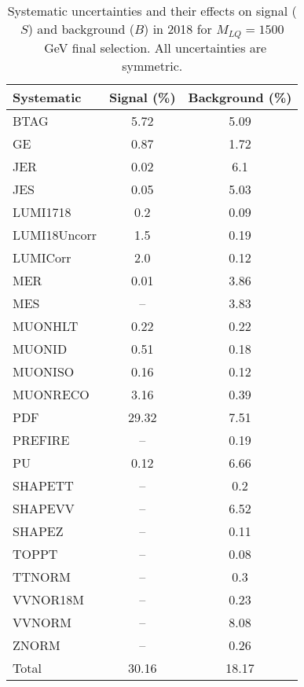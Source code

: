 \begin{table}[htbp]
\begin{center}
\caption{Systematic uncertainties and their effects on signal ($S$) and background ($B$) in 2018 for $M_{LQ}=1500$~GeV final selection. All uncertainties are symmetric.}
\begin{tabular}{lcc}
\hline\hline
Systematic & Signal (\%) & Background (\%) \\ \hline 
BTAG & 5.72 & 5.09\\ 
GE & 0.87 & 1.72\\ 
JER & 0.02 & 6.1\\ 
JES & 0.05 & 5.03\\ 
LUMI1718 & 0.2 & 0.09\\ 
LUMI18Uncorr & 1.5 & 0.19\\ 
LUMICorr & 2.0 & 0.12\\ 
MER & 0.01 & 3.86\\ 
MES & -- & 3.83\\ 
MUONHLT & 0.22 & 0.22\\ 
MUONID & 0.51 & 0.18\\ 
MUONISO & 0.16 & 0.12\\ 
MUONRECO & 3.16 & 0.39\\ 
PDF & 29.32 & 7.51\\ 
PREFIRE & -- & 0.19\\ 
PU & 0.12 & 6.66\\ 
SHAPETT & -- & 0.2\\ 
SHAPEVV & -- & 6.52\\ 
SHAPEZ & -- & 0.11\\ 
TOPPT & -- & 0.08\\ 
TTNORM & -- & 0.3\\ 
VVNOR18M & -- & 0.23\\ 
VVNORM & -- & 8.08\\ 
ZNORM & -- & 0.26\\ 
Total & 30.16 & 18.17\\ \hline \hline
\end{tabular}
\label{tab:SysUncertainties_uujj_1500}
\end{center}
\end{table}

